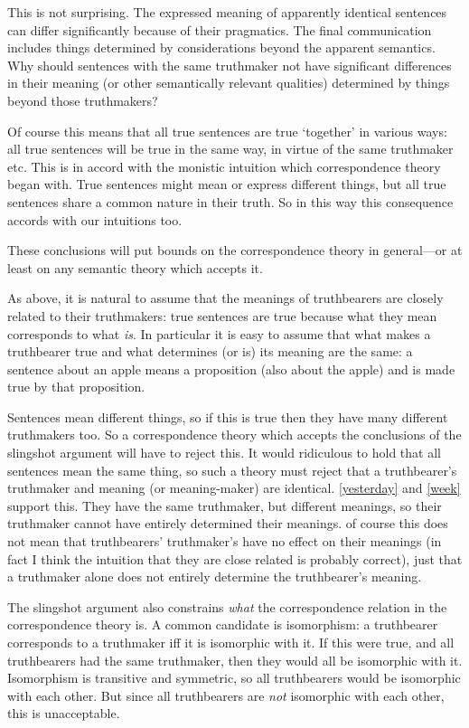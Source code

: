 This is not surprising.
The expressed meaning of apparently identical sentences can differ significantly because of their pragmatics.
The final communication includes things determined by considerations beyond the apparent semantics. %
Why should sentences with the same truthmaker not have significant differences in their meaning (or other semantically relevant qualities) determined by things beyond those truthmakers?

Of course this means that all true sentences are true `together' in various ways: all true sentences will be true in the same way, in virtue of the same truthmaker etc.
This is in accord with the monistic intuition which correspondence theory began with.
True sentences might mean or express different things, but all true sentences share a common nature in their truth.
So in this way this consequence accords with our intuitions too.

These conclusions will put bounds on the correspondence theory in general---or at least on any semantic theory which accepts it.

As above, it is natural to assume that the meanings of truthbearers are closely related to their truthmakers: true sentences are true because what they mean corresponds to what \emph{is}.
In particular it is easy to assume that what makes a truthbearer true and what determines (or is) its meaning are the same: a sentence about an apple means a proposition (also about the apple) and is made true by that proposition.

Sentences mean different things, so if this is true then they have many different truthmakers too.
So a correspondence theory which accepts the conclusions of the slingshot argument will have to reject this.
It would ridiculous to hold that all sentences mean the same thing, so such a theory must reject that a truthbearer's truthmaker and meaning (or meaning-maker) are identical.
\ref{yesterday} and \ref{week} support this.
They have the same truthmaker, but different meanings, so their truthmaker cannot have entirely determined their meanings.
of course this does not mean that truthbearers' truthmaker's have no effect on their meanings (in fact I think the intuition that they are close related is probably correct), just that a truthmaker alone does not entirely determine the truthbearer's meaning.

The slingshot argument also constrains \emph{what} the correspondence relation in the correspondence theory is.
A common candidate is isomorphism: a truthbearer corresponds to a truthmaker iff it is isomorphic with it.
If this were true, and all truthbearers had the same truthmaker, then they would all be isomorphic with it.
Isomorphism is transitive and symmetric, so all truthbearers would be isomorphic with each other.
But since all truthbearers are \emph{not} isomorphic with each other, this is unacceptable.

